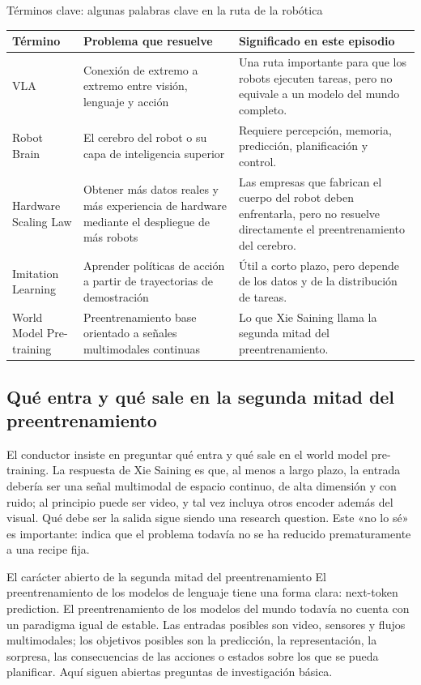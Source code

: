 \documentclass[a4paper]{article}
\begin{document}
\begin{knowledgebox}{Términos clave: algunas palabras clave en la ruta de la robótica}
\begin{tabularx}{\textwidth}{p{}p{}X}
\toprule
Término & Problema que resuelve & Significado en este episodio \\
\midrule
VLA & Conexión de extremo a extremo entre visión, lenguaje y acción & Una ruta importante para que los robots ejecuten tareas, pero no equivale a un modelo del mundo completo. \\
Robot Brain & El cerebro del robot o su capa de inteligencia superior & Requiere percepción, memoria, predicción, planificación y control. \\
Hardware Scaling Law & Obtener más datos reales y más experiencia de hardware mediante el despliegue de más robots & Las empresas que fabrican el cuerpo del robot deben enfrentarla, pero no resuelve directamente el preentrenamiento del cerebro. \\
Imitation Learning & Aprender políticas de acción a partir de trayectorias de demostración & Útil a corto plazo, pero depende de los datos y de la distribución de tareas. \\
World Model Pre-training & Preentrenamiento base orientado a señales multimodales continuas & Lo que Xie Saining llama la segunda mitad del preentrenamiento. \\
\bottomrule
\end{tabularx}
\end{knowledgebox}

\subsection{Qué entra y qué sale en la segunda mitad del preentrenamiento}

El conductor insiste en preguntar qué entra y qué sale en el world model pre-training. La respuesta de Xie Saining es que, al menos a largo plazo, la entrada debería ser una señal multimodal de espacio continuo, de alta dimensión y con ruido; al principio puede ser video, y tal vez incluya otros encoder además del visual. Qué debe ser la salida sigue siendo una research question. Este «no lo sé» es importante: indica que el problema todavía no se ha reducido prematuramente a una recipe fija.

\begin{importantbox}{El carácter abierto de la segunda mitad del preentrenamiento}
El preentrenamiento de los modelos de lenguaje tiene una forma clara: next-token prediction. El preentrenamiento de los modelos del mundo todavía no cuenta con un paradigma igual de estable. Las entradas posibles son video, sensores y flujos multimodales; los objetivos posibles son la predicción, la representación, la sorpresa, las consecuencias de las acciones o estados sobre los que se pueda planificar. Aquí siguen abiertas preguntas de investigación básica.
\end{importantbox}
\end{document}
